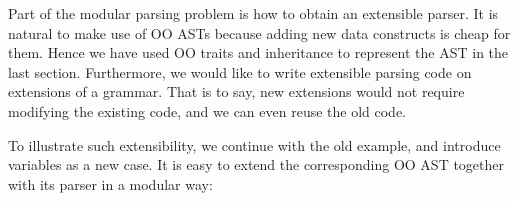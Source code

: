 \begin{comment}
This section introduces the problem of semantic modular parsing which motivates our work, and an initial solution using only standard inheritance in OO.

\subsection{Modular Parsing Problem}\label{subsec:parsingproblem}
\huang{or "Parsing Extensible ASTs" ?}
The extensibility issues of AST structures and operations that process them, can be illustrated by the famous Expression Problem~\cite{wadler1998expression}. There are two dimensions of extensibility:

\begin{itemize}
\item \textbf{Extension 1}: adding a new data variant (or rather, a new constructor of ASTs).
\item \textbf{Extension 2}: adding a new operation over ASTs.
\end{itemize}

We already have solutions such Object Algebras~\cite{Oliveira:2012} for this problem. However, when ASTs evolve, the corresponding parsers which produce such structures should also change accordingly. Our motivation is to build modular parsers, which can be extended together with ASTs. Futhermore, we focus on semantic modularity, that means we expect parsers to be modularly type-checked and separately compiled.

In the rest of Section~\ref{sec:inheritance}, we will introduce an solution for modular parsing with Extension 1 above, using only standard inheritance in OO. Extension 2 will be discussed in Section~\ref{sec:algebrasandparsing}.
\end{comment}

Part of the modular parsing problem is how to obtain an extensible parser. It
is natural to make use of OO ASTs because adding new data constructs is cheap for
them. Hence we have used OO traits and inheritance to represent the AST in the last
section. Furthermore, we would like to write extensible parsing code on extensions of
a grammar. That is to say, new extensions would not require modifying the existing code,
and we can even reuse the old code.

To illustrate such extensibility, we continue with the old
example, and introduce variables as a new case.
It is easy to extend the corresponding OO AST together with its parser in a modular way:

